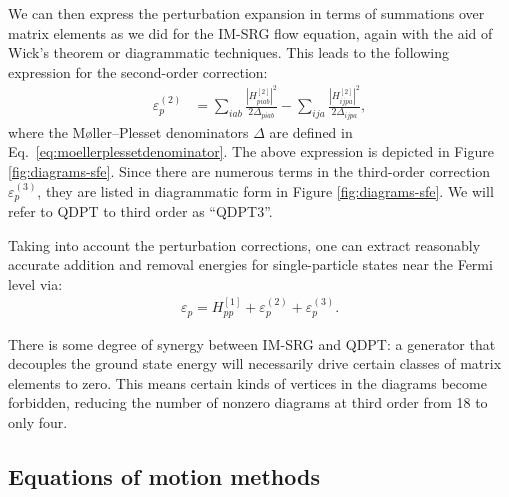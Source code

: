 We can then express the perturbation expansion in terms of summations over matrix elements as we did for the IM-SRG flow equation, again with the aid of Wick's theorem or diagrammatic techniques.  This leads to the following expression for the second-order correction:
\begin{align*}
  \varepsilon_p^{(2)}
  &=
    \sum_{i a b} \frac{|H^{[2]}_{p i a b}|^2}{2 \Delta_{p i a b}}
    - \sum_{i j a} \frac{|H^{[2]}_{i j p a}|^2}{2 \Delta_{i j p a}},
\end{align*}
where the M\o ller--Plesset denominators $\Delta$ are defined in Eq.\ \eqref{eq:moellerplessetdenominator}.  The above expression is depicted in Figure \ref{fig:diagrams-sfe}.  Since there are numerous terms in the third-order correction $\varepsilon_p^{(3)}$, they are listed in diagrammatic form in Figure \ref{fig:diagrams-sfe}.  We will refer to QDPT to third order as ``QDPT3''.

Taking into account the perturbation corrections, one can extract reasonably accurate addition and removal energies for single-particle states near the Fermi level via:
\begin{align*}
  \varepsilon_p = H^{[1]}_{p p} + \varepsilon_p^{(2)} + \varepsilon_p^{(3)}.
\end{align*}

There is some degree of synergy between IM-SRG and QDPT: a generator that decouples the ground state energy will necessarily drive certain classes of matrix elements to zero.  This means certain kinds of vertices in the diagrams become forbidden, reducing the number of nonzero diagrams at third order from 18 to only four.

\subsection{Equations of motion methods}

